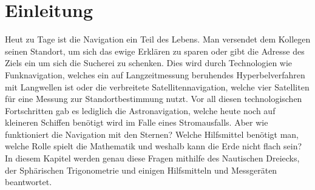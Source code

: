 

\section{Einleitung}
Heut zu Tage ist die Navigation ein Teil des Lebens. 
Man versendet dem Kollegen seinen Standort, um sich das ewige Erklären zu sparen oder gibt die Adresse des Ziels ein um sich die Sucherei zu schenken. 
Dies wird durch Technologien wie Funknavigation, welches ein auf Langzeitmessung beruhendes Hyperbelverfahren mit Langwellen ist oder die verbreitete Satellitennavigation, welche vier Satelliten für eine Messung zur Standortbestimmung nutzt.
Vor all diesen technologischen Fortschritten gab es lediglich die Astronavigation, welche heute noch auf kleineren Schiffen benötigt wird im Falle eines Stromausfalls. 
Aber wie funktioniert die Navigation mit den Sternen? Welche Hilfsmittel benötigt man, welche Rolle spielt die Mathematik und weshalb kann die Erde nicht flach sein? 
In diesem Kapitel werden genau diese Fragen mithilfe des Nautischen Dreiecks, der Sphärischen Trigonometrie und einigen Hilfsmitteln und Messgeräten beantwortet.